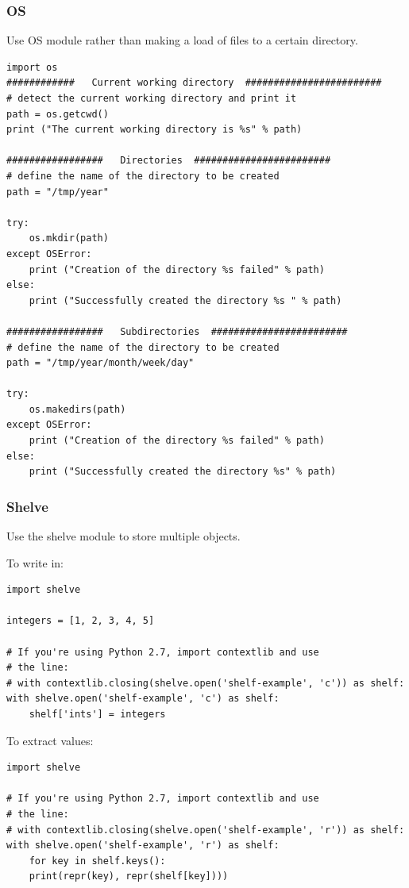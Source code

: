 \documentclass[11pt]{article}
\begin{document}
\subsubsection{OS}
\label{sec:org83d19a2}
Use OS module rather than making a load of files to a certain directory. 
\begin{verbatim}
import os
############   Current working directory  ########################
# detect the current working directory and print it
path = os.getcwd()  
print ("The current working directory is %s" % path) 

#################   Directories  ########################
# define the name of the directory to be created
path = "/tmp/year"

try:  
    os.mkdir(path)
except OSError:  
    print ("Creation of the directory %s failed" % path)
else:  
    print ("Successfully created the directory %s " % path)

#################   Subdirectories  ########################
# define the name of the directory to be created
path = "/tmp/year/month/week/day"

try:  
    os.makedirs(path)
except OSError:  
    print ("Creation of the directory %s failed" % path)
else:  
    print ("Successfully created the directory %s" % path)
\end{verbatim}
\subsubsection{Shelve}
\label{sec:org1413b7c}
Use the shelve module to store multiple objects. 

To write in:
\begin{verbatim}
import shelve

integers = [1, 2, 3, 4, 5]

# If you're using Python 2.7, import contextlib and use
# the line:
# with contextlib.closing(shelve.open('shelf-example', 'c')) as shelf:
with shelve.open('shelf-example', 'c') as shelf:
    shelf['ints'] = integers
\end{verbatim}

To extract values:
\begin{verbatim}
import shelve

# If you're using Python 2.7, import contextlib and use
# the line:
# with contextlib.closing(shelve.open('shelf-example', 'r')) as shelf:
with shelve.open('shelf-example', 'r') as shelf:
    for key in shelf.keys():
	print(repr(key), repr(shelf[key])))
\end{verbatim}
\end{document}
